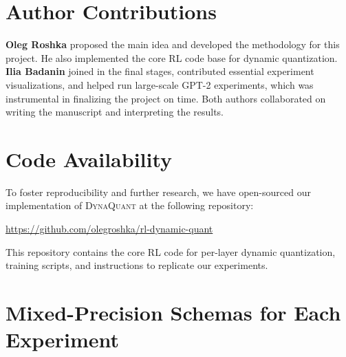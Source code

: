 \documentclass{article}
\begin{document}
	\section{Author Contributions}
	\label{sec:author-contributions}
	
	\textbf{Oleg Roshka} proposed the main idea and developed the methodology for this project. 
	He also implemented the core RL code base for dynamic quantization. 
	\textbf{Ilia Badanin} joined in the final stages, contributed essential experiment visualizations, and helped run large-scale GPT-2 experiments, which was instrumental in finalizing the project on time. 
	Both authors collaborated on writing the manuscript and interpreting the results.

    \section{Code Availability}
    \label{sec:code-availability}
    
    To foster reproducibility and further research, 
    we have open-sourced our implementation of 
    \textsc{DynaQuant} at the following repository:
    
    \url{https://github.com/olegroshka/rl-dynamic-quant}
    
    This repository contains the core RL code for per-layer dynamic quantization, 
    training scripts, and instructions to replicate our experiments.
    	
	
	\balance
	
	
	
	\clearpage
	\appendix
	\section{Mixed-Precision Schemas for Each Experiment}
	\label{sec:appendix-schemas}
	
\end{document}
